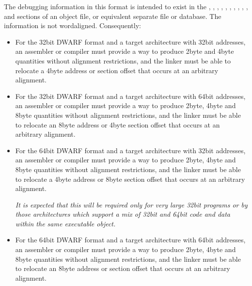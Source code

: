 The debugging information in this format is intended to
exist 
in 
the , 
, 
,
, 
, 
, 
,
, 
, 
, 
and 
sections of an object file, or equivalent
separate file or database. The information is not 
word\dash aligned. Consequently:

\begin{itemize}
\item For the 32\dash bit DWARF format and a target architecture with
32\dash bit addresses, an assembler or compiler must provide a way
to produce 2\dash byte and 4\dash byte quantities without alignment
restrictions, and the linker must be able to relocate a
4\dash byte address or 
section offset that occurs at an arbitrary
alignment.

\item For the 32\dash bit DWARF format and a target architecture with
64\dash bit addresses, an assembler or compiler must provide a
way to produce 2\dash byte, 4\dash byte and 8\dash byte quantities without
alignment restrictions, and the linker must be able to relocate
an 8\dash byte address or 4\dash byte 
section offset that occurs at an
arbitrary alignment.

\item For the 64\dash bit DWARF format and a target architecture with
32\dash bit addresses, an assembler or compiler must provide a
way to produce 2\dash byte, 4\dash byte and 8\dash byte quantities without
alignment restrictions, and the linker must be able to relocate
a 4\dash byte address or 8\dash byte 
section offset that occurs at an
arbitrary alignment.

\textit{It is expected that this will be required only for very large
32\dash bit programs or by those architectures which support
a mix of 32\dash bit and 64\dash bit code and data within the same
executable object.}

\item For the 64\dash bit DWARF format and a target architecture with
64\dash bit addresses, an assembler or compiler must provide a
way to produce 2\dash byte, 4\dash byte and 8\dash byte quantities without
alignment restrictions, and the linker must be able to
relocate an 8\dash byte address or 
section offset that occurs at
an arbitrary alignment.
\end{itemize}

